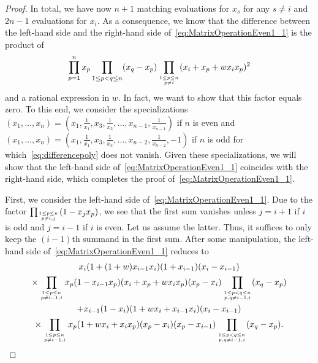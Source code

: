 \documentclass[10pt,a4paper]{article}
\theoremstyle{definition}
\newcommand\myatop[2]{\genfrac{}{}{0pt}{}{#1}{#2}}
\begin{document}
\begin{proof}
		In total, we have now $n+1$ matching evaluations for $x_s$ for any $s\neq i$ and $2n-1$ evaluations for $x_i$. As a consequence, we know that the difference between the left-hand side and the right-hand side of~\eqref{eq:MatrixOperationEven1_1} is the product of
		\begin{equation}\label{eq:differencepoly}
			\prod_{p=1}^{n} x_p \prod_{1 \le p < q \le n} (x_q-x_p) \prod_{\myatop{1 \le p \le n}{p \neq i}} (x_i + x_p + w x_i x_p)^2
		\end{equation}
		and a rational expression in $w$. In fact, we want to show that this factor equals zero. To this end, we consider the specializations $(x_1,\dots,x_n)=(x_1,\frac{1}{x_1},x_3,\frac{1}{x_3},\dots,x_{n-1},\frac{1}{x_{n-1}})$ if $n$ is even and $(x_1,\dots,x_n)=(x_1,\frac{1}{x_1},x_3,\frac{1}{x_3},\dots,x_{n-2},\frac{1}{x_{n-2}},-1)$ if $n$ is odd for which~\eqref{eq:differencepoly} does not vanish. Given these specializations, we will show that the left-hand side of~\eqref{eq:MatrixOperationEven1_1} coincides with the right-hand side, which completes the proof of~\eqref{eq:MatrixOperationEven1_1}.
		
		First, we consider the left-hand side of~\eqref{eq:MatrixOperationEven1_1}. Due to the factor $\prod_{\myatop{1 \le p \le n}{p \neq i,j}} (1-x_j x_p)$, we see that the first sum vanishes unless $j=i+1$ if $i$ is odd and $j=i-1$ if $i$ is even. Let us assume the latter. Thus, it suffices to only keep the $(i-1)$th summand in the first sum. After some manipulation, the left-hand side of~\eqref{eq:MatrixOperationEven1_1} reduces to
		\begin{multline*}
			x_i (1+(1+w) x_{i-1} x_i) (1+x_{i-1}) (x_i-x_{i-1})\\
			\times \prod_{\myatop{1 \le p \le n}{p \neq i-1,i}} x_p (1-x_{i-1} x_p)  (x_i+x_p+w x_i x_p) (x_p - x_i) \prod_{\myatop{1 \le p < q \le n}{p,q \neq i-1,i}} (x_q - x_p) \\
			+ x_{i-1} (1-x_i) (1+w x_i+x_{i-1} x_i) (x_i-x_{i-1})\\
			\times\prod\limits_{\myatop{1 \le p \le n}{p \neq i-1,i}} x_p (1+ w x_i + x_i x_p) (x_p-x_i) (x_p-x_{i-1}) \prod_{\myatop{1 \le p <q \le n}{p,q \neq i-1,i}} (x_q -x_p).
		\end{multline*}
		

\end{proof}
\end{document}
